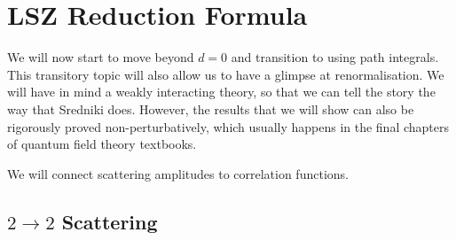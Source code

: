 
\chapter{LSZ Reduction Formula}%
\label{cha:lsz_reduction_formula}

We will now start to move beyond $d = 0$ and transition to using path integrals.
This transitory topic will also allow us to have a glimpse at renormalisation.
We will have in mind a weakly interacting theory, so that we can tell the story the way that Sredniki does. However, the results that we will show can also be rigorously proved non-perturbatively, which usually happens in the final chapters of quantum field theory textbooks.

We will connect scattering amplitudes to correlation functions.
\section{\texorpdfstring{$2 \to 2$ }{}Scattering}%
\label{sec:$2 to 2$ _scattering}

